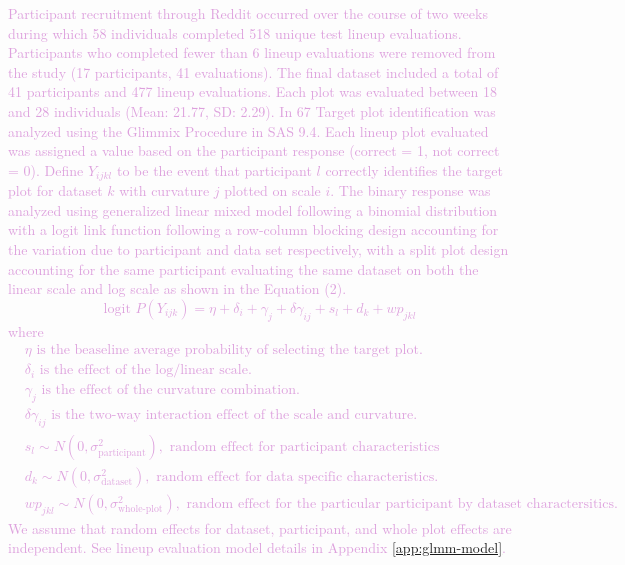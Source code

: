 \documentclass[]{interact}
\theoremstyle{plain}%
\theoremstyle{definition}
\theoremstyle{remark}
\begin{document}
\textcolor{Plum}{
Participant recruitment through Reddit occurred over the course of two weeks during which 58 individuals completed 518 unique test lineup evaluations. 
Participants who completed fewer than 6 lineup evaluations were removed from the study (17 participants, 41 evaluations).
The final dataset included a total of 41 participants and 477 lineup evaluations. 
Each plot was evaluated between 18 and 28 individuals (Mean: 21.77, SD: 2.29). 
In 67%
}
\textcolor{Plum}{
Target plot identification was analyzed using the Glimmix Procedure in SAS 9.4. 
Each lineup plot evaluated was assigned a value based on the participant response (correct = 1, not correct = 0). 
Define $Y_{ijkl}$ to be the event that participant $l$ correctly identifies the target plot for dataset $k$ with curvature $j$ plotted on scale $i$. 
The binary response was analyzed using generalized linear mixed model following a binomial distribution with a logit link function following a row-column blocking design accounting for the variation due to participant and data set respectively, with a split plot design accounting for the same participant evaluating the same dataset on both the linear scale and log scale as shown in the Equation (2).
\begin{equation}
\text{logit }P(Y_{ijk}) = \eta + \delta_i + \gamma_j + \delta \gamma_{ij} + s_l + d_k + wp_{jkl}
\end{equation}
where
\begin{align*}
&\eta               \text{ is the beaseline average probability of selecting the target plot.} \\
&\delta_i           \text{ is the effect of the log/linear scale.} \\
&\gamma_j           \text{ is the effect of the curvature combination.} \\
&\delta\gamma_{ij}  \text{ is the two-way interaction effect of the scale and curvature.} \\
&s_l \sim N(0,\sigma^2_\text{{participant}}), \text{ random effect for participant characteristics} \\
&d_k \sim N(0,\sigma^2_{\text{dataset}}), \text{ random effect for data specific characteristics.} \\
&wp_{jkl} \sim N(0,\sigma^2_\text{{whole-plot}}), \text{ random effect for the particular participant by dataset charactersitics.}
\end{align*}
We assume that random effects for dataset, participant, and whole plot effects are independent. See lineup evaluation model details in Appendix \ref{app:glmm-model}.
}
\end{document}
